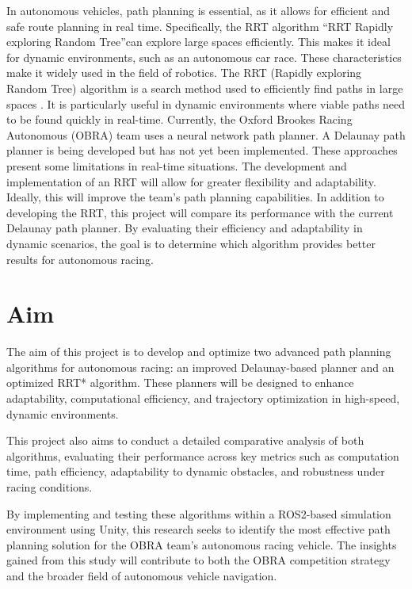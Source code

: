 \documentclass[a4paper,11pt]{report}
\begin{document}
In autonomous vehicles, path planning is essential, as it allows for efficient and safe route
planning in real time. Specifically, the RRT algorithm \textquotedblleft RRT Rapidly exploring Random
Tree\textquotedblright can explore large spaces efficiently. This makes it ideal for dynamic environments,
such as an autonomous car race. These characteristics make it widely used in the field
of robotics. The RRT (Rapidly exploring Random Tree) algorithm is a search method
used to efficiently find paths in large spaces \cite{reference1}. It is particularly useful in dynamic
environments where viable paths need to be found quickly in real-time. Currently, the
Oxford Brookes Racing Autonomous (OBRA) team uses a neural network path planner.
A Delaunay path planner is being developed but has not yet been implemented. These
approaches present some limitations in real-time situations. The development and implementation of an RRT \cite{reference2} will allow for greater flexibility and adaptability. Ideally, this
will improve the team’s path planning capabilities. In addition to developing the RRT,
this project will compare its performance with the current Delaunay path planner. By
evaluating their efficiency and adaptability in dynamic scenarios, the goal is to determine
which algorithm provides better results for autonomous racing.

\section{Aim}
The aim of this project is to develop and optimize two advanced path planning algorithms for autonomous racing: an improved Delaunay-based planner and an optimized RRT* algorithm. These planners will be designed to enhance adaptability, computational efficiency, and trajectory optimization in high-speed, dynamic environments. 

This project also aims to conduct a detailed comparative analysis of both algorithms, evaluating their performance across key metrics such as computation time, path efficiency, adaptability to dynamic obstacles, and robustness under racing conditions. 

By implementing and testing these algorithms within a ROS2-based simulation environment using Unity, this research seeks to identify the most effective path planning solution for the OBRA team's autonomous racing vehicle. The insights gained from this study will contribute to both the OBRA competition strategy and the broader field of autonomous vehicle navigation.
\end{document}
